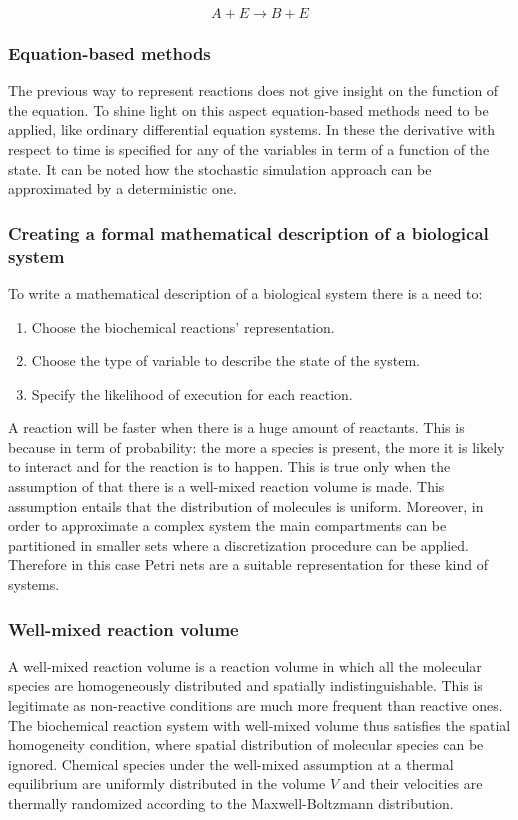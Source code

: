         $$A+E\rightarrow B+E$$

    \subsubsection{Equation-based methods}
    The previous way to represent reactions does not give insight on the function of the equation.
    To shine light on this aspect equation-based methods need to be applied, like ordinary differential equation systems.
    In these the derivative with respect to time is specified for any of the variables in term of a function of the state.
    It can be noted how the stochastic simulation approach can be approximated by a deterministic one.

    \subsubsection{Creating a formal mathematical description of a biological system}
    To write a mathematical description of a biological system there is a need to:

    \begin{enumerate}
      \item Choose the biochemical reactions' representation.
      \item Choose the type of variable to describe the state of the system.
      \item Specify the likelihood of execution for each reaction.
    \end{enumerate}

    A reaction will be faster when there is a huge amount of reactants.
    This is because in term of probability: the more a species is present, the more it is likely to interact and for the reaction is to happen.
    This is true only when the assumption of that there is a well-mixed reaction volume is made.
    This assumption entails that the distribution of molecules is uniform.
    Moreover, in order to approximate a complex system the main compartments can be partitioned in smaller sets where a discretization procedure can be applied.
    Therefore in this case Petri nets are a suitable representation for these kind of systems.

    \subsubsection{Well-mixed reaction volume}
    A well-mixed reaction volume is a reaction volume in which all the molecular species are homogeneously distributed and spatially indistinguishable.
    This is legitimate as non-reactive conditions are much more frequent than reactive ones.
    The biochemical reaction system with well-mixed volume thus satisfies the spatial homogeneity condition, where spatial distribution of molecular species can be ignored.
    Chemical species under the well-mixed assumption at a thermal equilibrium are uniformly distributed in the volume $V$ and their velocities are thermally randomized according to the Maxwell-Boltzmann distribution.

